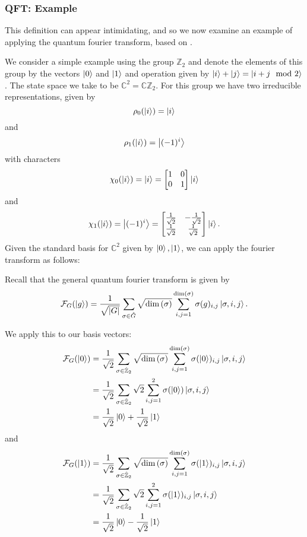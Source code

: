 \documentclass{beamer}
\renewcommand{\ket}{\Ket}
\renewcommand{\ket}{\Ket}
\newcommand{\abs}[1]{\left\lvert #1 \right\rvert}
\renewcommand{\dim}[1]{\textnormal{dim}\left(#1\right)}
\newcommand{\bb}[1]{\mathbb{#1}}
\renewcommand{\cal}[1]{\mathcal{#1}}
\begin{document}
\begin{frame}
\frametitle{QFT: Example}
        This definition can appear intimidating, and so we now examine an example of applying the quantum fourier transform, based on \cite{hadfield}.
        \begin{example}
            We consider a simple example using the group $\bb{Z}_2$ and denote the elements of this group by the vectors $\ket{0}$ and $\ket{1}$ and operation given by $\ket{i} + \ket{j} = \ket{i + j \mod 2}$. The state space we take to be $\bb{C}^2 = \bb{C}\bb{Z}_2$.
            For this group we have two irreducible representations, given by
                $$\rho_0(\ket{i}) = \ket{i}$$ 
            and 
                $$\rho_1(\ket{i}) = \ket{(-1)^i}$$
            with characters 
                $$\chi_0(\ket{i}) = \ket{i} = \begin{bmatrix} 1 & 0\\ 0 & 1\end{bmatrix} \ket{i}$$
            and 
                $$\chi_1(\ket{i}) = \ket{(-1)^i} = \begin{bmatrix} \frac{1}{\sqrt{2}} & -\frac{1}{\sqrt{2}}\\ \frac{1}{\sqrt{2}} & \frac{1}{\sqrt{2}}\end{bmatrix} \ket{i}.$$
            Given the standard basis for $\bb{C}^2$ given by $\ket{0}, \ket{1}$, we can apply the fourier transform as follows:

            Recall that the general quantum fourier transform is given by
                $$\cal{F}_G(\ket{g}) = \frac{1}{\sqrt{\abs{G}}} \sum_{\sigma \in \hat{G}} \sqrt{\dim{\sigma}} \sum_{i,j = 1}^{\dim{\sigma}} \sigma(g)_{i,j} \ket{\sigma, i, j}.$$

            We apply this to our basis vectors:
            \begin{align*}
            \cal{F}_G(\ket{0}) &= \frac{1}{\sqrt{2}} \sum_{\sigma \in \hat{\bb{Z}}_2} \sqrt{\dim{\sigma}} \sum_{i,j = 1}^{\dim{\sigma}} \sigma(\ket{0})_{i,j} \ket{\sigma, i, j}\\
            &= \frac{1}{\sqrt{2}} \sum_{\sigma \in \hat{\bb{Z}}_2} \sqrt{2} \sum_{i, j = 1}^2 \sigma(\ket{0}) \ket{\sigma, i, j}\\
            &= \frac{1}{\sqrt{2}} \ket{0} + \frac{1}{\sqrt{2}} \ket{1}
            \end{align*}
            and
            \begin{align*}
            \cal{F}_G(\ket{1}) &= \frac{1}{\sqrt{2}} \sum_{\sigma \in \hat{\bb{Z}}_2} \sqrt{\dim{\sigma}} \sum_{i,j = 1}^{\dim{\sigma}} \sigma(\ket{1})_{i,j} \ket{\sigma, i, j}\\
            &= \frac{1}{\sqrt{2}} \sum_{\sigma \in \hat{\bb{Z}}_2} \sqrt{2} \sum_{i,j = 1}^2 \sigma(\ket{1})_{i,j} \ket{\sigma, i, j}\\
            &= \frac{1}{\sqrt{2}} \ket{0} - \frac{1}{\sqrt{2}} \ket{1}
            \end{align*}
        \end{example}
\end{frame}
\end{document}

